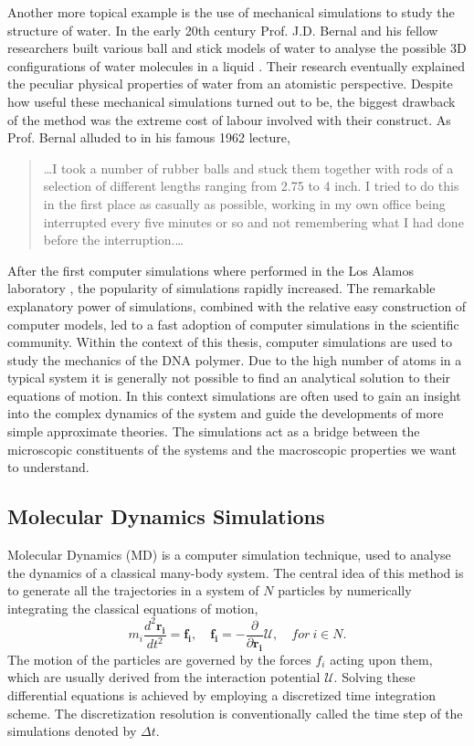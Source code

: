 Another more topical example is the use of mechanical simulations to study the
structure of water.  In the early 20th century Prof. J.D. Bernal and his fellow
researchers built various ball and stick models of water to analyse the possible 3D
configurations of water molecules in a liquid \cite{Finney_2007}. Their research
eventually explained the peculiar physical properties of water from an atomistic
perspective. Despite how useful these mechanical simulations turned out to be, the
biggest drawback of the method was the extreme cost of labour involved with their
construct. As Prof. Bernal alluded to in his famous 1962 lecture,

\begin{quote}
\dots I took a number of rubber balls and stuck them together with rods of a
selection of different lengths ranging from 2.75 to 4 inch. I tried to do this in the
first place as casually as possible, working in my own office being interrupted every
five minutes or so and not remembering what I had done before the interruption.\dots
\cite{Bernal1962}
\end{quote}

After the first computer simulations where performed in the Los Alamos laboratory
\cite{Metropolis1953}, the
popularity of simulations rapidly increased. The remarkable explanatory power of
simulations, combined with the relative easy construction of computer models, led to a
fast adoption of computer simulations in the scientific community. Within the context of
this thesis, computer simulations are used to study the mechanics of
the DNA polymer. Due to the high number of atoms in a typical system it is generally
not possible to find an analytical solution to their equations of motion. In this
context simulations are often used to gain an insight into the complex dynamics of the
system and guide the developments of more simple approximate theories. The simulations
act as a bridge between the microscopic constituents of the systems and the macroscopic
properties we want to understand.

\subsection{Molecular Dynamics Simulations}
Molecular Dynamics (MD) is a computer simulation technique, used to analyse
the dynamics of a classical many-body system. The central idea of this method is to
generate all the trajectories in a system of $N$ particles by numerically
integrating the classical equations of motion,
\[
m_i \frac{d^2 \boldsymbol{r_i}}{dt^2} = \boldsymbol{f_i}, \quad \boldsymbol{f_i} = -
    \frac{\partial}{\partial \boldsymbol{r_i}} \mathcal{U}, \quad for\ i \in N.
\]
The motion of the particles are governed by the forces $f_i$ acting upon them, which are
usually derived from the interaction potential $\mathcal{U}$.
Solving these differential equations is achieved by employing a discretized time
integration scheme. The discretization resolution is conventionally called the time step
of the simulations denoted by $\Delta t$.

